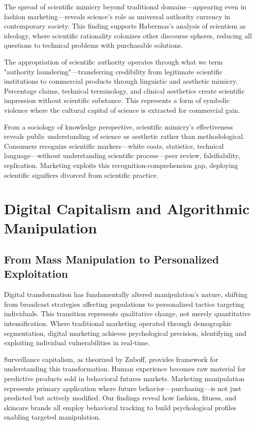 The spread of scientific mimicry beyond traditional domains—appearing even in fashion marketing—reveals science's role as universal authority currency in contemporary society. This finding supports Habermas's analysis of scientism as ideology, where scientific rationality colonizes other discourse spheres, reducing all questions to technical problems with purchasable solutions.

The appropriation of scientific authority operates through what we term "authority laundering"—transferring credibility from legitimate scientific institutions to commercial products through linguistic and aesthetic mimicry. Percentage claims, technical terminology, and clinical aesthetics create scientific impression without scientific substance. This represents a form of symbolic violence where the cultural capital of science is extracted for commercial gain.

From a sociology of knowledge perspective, scientific mimicry's effectiveness reveals public understanding of science as aesthetic rather than methodological. Consumers recognize scientific markers—white coats, statistics, technical language—without understanding scientific process—peer review, falsifiability, replication. Marketing exploits this recognition-comprehension gap, deploying scientific signifiers divorced from scientific practice.

\section{Digital Capitalism and Algorithmic Manipulation}
\label{sec:digital_capitalism}

\subsection{From Mass Manipulation to Personalized Exploitation}

Digital transformation has fundamentally altered manipulation's nature, shifting from broadcast strategies affecting populations to personalized tactics targeting individuals. This transition represents qualitative change, not merely quantitative intensification. Where traditional marketing operated through demographic segmentation, digital marketing achieves psychological precision, identifying and exploiting individual vulnerabilities in real-time.

Surveillance capitalism, as theorized by Zuboff, provides framework for understanding this transformation. Human experience becomes raw material for predictive products sold in behavioral futures markets. Marketing manipulation represents primary application where future behavior—purchasing—is not just predicted but actively modified. Our findings reveal how fashion, fitness, and skincare brands all employ behavioral tracking to build psychological profiles enabling targeted manipulation.

